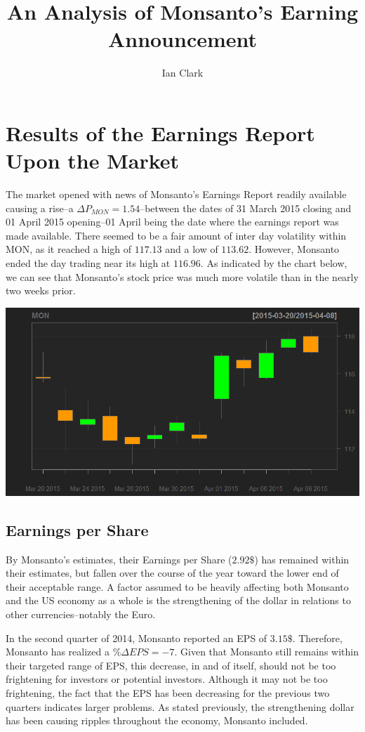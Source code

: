 \documentclass[12pt,letterpaper,english]{article}
\title{An Analysis of Monsanto's Earning Announcement}
\author{Ian Clark}
\date{}
\newcommand{\newpar}{\vspace{10mm}\noindent}
\begin{document}
\maketitle

\section{Results of the Earnings Report Upon the Market}
The market opened with news of Monsanto's Earnings Report readily available causing a rise--a $\Delta{P_{MON}} = 1.54 $--between the dates of 31 March 2015 closing and 01 April 2015 opening--01 April being the date where the earnings report was made available. There seemed to be a fair amount of inter day volatility within MON, as it reached a high of $117.13$ and a low of $113.62$. However, Monsanto ended the day trading near its high at $116.96$. As indicated by the chart below, we can see that Monsanto's stock price was much more volatile than in the nearly two weeks prior.

\newpar
\begin{center}
\includegraphics[scale=0.5]{Data/CandleChart.png}
\end{center}

\newpar
\subsection{Earnings per Share}
By Monsanto's estimates, their Earnings per Share ($2.92 \$ $) has remained within their estimates, but fallen over the course of the year toward the lower end of their acceptable range. A factor assumed to be heavily affecting both Monsanto and the US economy as a whole is the strengthening of the dollar in relations to other currencies--notably the Euro.

\newpar
In the second quarter of 2014, Monsanto reported an EPS of $3.15 \$ $. Therefore, Monsanto has realized a $\%\Delta{EPS} = -7$. Given that Monsanto still remains within their targeted range of EPS, this decrease, in and of itself, should not be too frightening for investors or potential investors. Although it may not be too frightening, the fact that the EPS has been decreasing for the previous two quarters indicates larger problems. As stated previously, the strengthening dollar has been causing ripples throughout the economy, Monsanto included.
\end{document}
